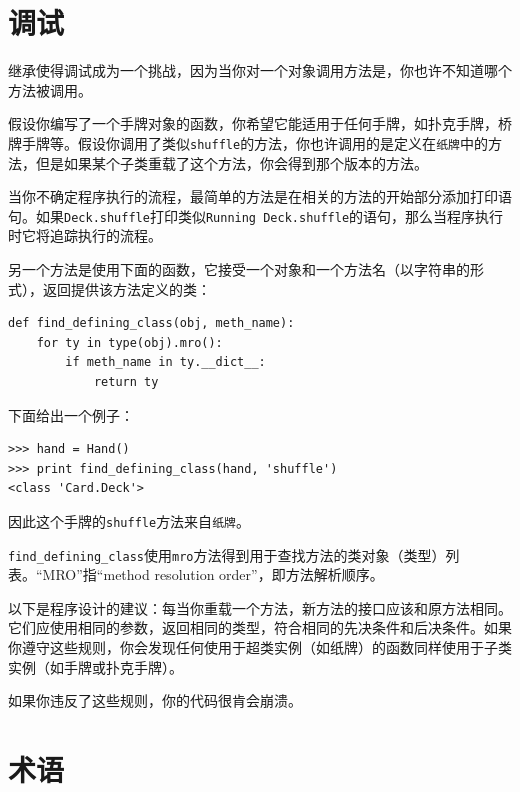 \section{调试}

继承使得调试成为一个挑战，因为当你对一个对象调用方法是，你也许不知道哪个方法被调用。


假设你编写了一个手牌对象的函数，你希望它能适用于任何手牌，如扑克手牌，桥牌手牌等。假设你调用了类似{\tt shuffle}的方法，你也许调用的是定义在{\tt 纸牌}中的方法，但是如果某个子类重载了这个方法，你会得到那个版本的方法。

当你不确定程序执行的流程，最简单的方法是在相关的方法的开始部分添加打印语句。如果{\tt Deck.shuffle}打印类似{\tt Running Deck.shuffle}的语句，那么当程序执行时它将追踪执行的流程。

另一个方法是使用下面的函数，它接受一个对象和一个方法名（以字符串的形式），返回提供该方法定义的类：

\beforeverb
\begin{verbatim}
def find_defining_class(obj, meth_name):
    for ty in type(obj).mro():
        if meth_name in ty.__dict__:
            return ty
\end{verbatim}
\afterverb
%
下面给出一个例子：

\beforeverb
\begin{verbatim}
>>> hand = Hand()
>>> print find_defining_class(hand, 'shuffle')
<class 'Card.Deck'>
\end{verbatim}
\afterverb
%
因此这个手牌的{\tt shuffle}方法来自{\tt 纸牌}。


\verb"find_defining_class"使用{\tt mro}方法得到用于查找方法的类对象（类型）列表。“MRO”指“method resolution order”，即方法解析顺序。


以下是程序设计的建议：每当你重载一个方法，新方法的接口应该和原方法相同。它们应使用相同的参数，返回相同的类型，符合相同的先决条件和后决条件。如果你遵守这些规则，你会发现任何使用于超类实例（如纸牌）的函数同样使用于子类实例（如手牌或扑克手牌）。

如果你违反了这些规则，你的代码很肯会崩溃。


\section{术语}


